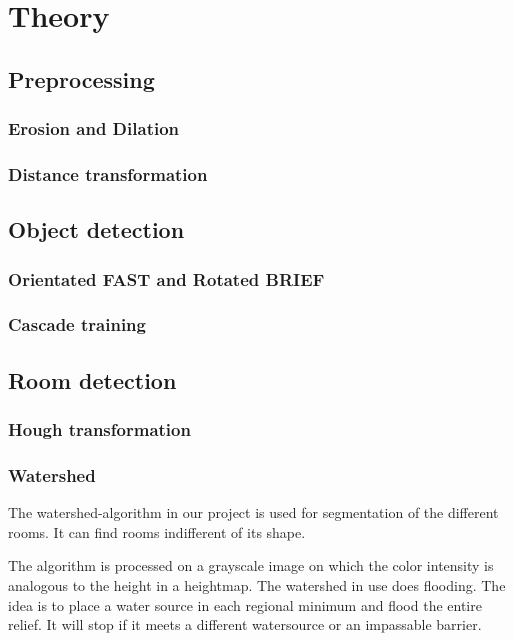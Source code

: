 \section{Theory}
\subsection{Preprocessing}
\subsubsection{Erosion and Dilation}
\subsubsection{Distance transformation}
\subsection{Object detection}
\subsubsection{Orientated FAST and Rotated BRIEF}
\subsubsection{Cascade training}
\subsection{Room detection}
\subsubsection{Hough transformation}
\subsubsection{Watershed}
The watershed-algorithm in our project is used for segmentation of the different rooms. It can find rooms indifferent of its shape.

The algorithm is processed on a grayscale image on which the color intensity is analogous to the height in a heightmap. The watershed in use does flooding. The idea is to place a water source in each regional minimum and flood the entire relief. It will stop if it meets a different watersource or an impassable barrier.
